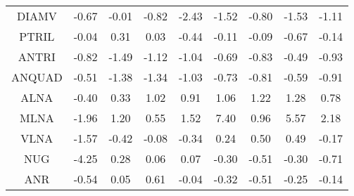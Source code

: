 \documentclass[11pt,a4paper]{report}
\begin{document}
\begin{longtable}{ | c || c | c | c | c | c | c | c || c |}
DIAMV &  \cellcolor[HTML]{FFEFEF} -0.67 &  \cellcolor[HTML]{FFFFFF} -0.01 &  \cellcolor[HTML]{FFE7E7} -0.82 &  \cellcolor[HTML]{FFBFBF} -2.43 &  \cellcolor[HTML]{FFD7D7} -1.52 &  \cellcolor[HTML]{FFE7E7} -0.80 &  \cellcolor[HTML]{FFD7D7} -1.53 &  \cellcolor[HTML]{FFE7E7} -1.11 \\
PTRIL &  \cellcolor[HTML]{FFFFFF} -0.04 &  \cellcolor[HTML]{F7F7FF} 0.31 &  \cellcolor[HTML]{FFFFFF} 0.03 &  \cellcolor[HTML]{FFF7F7} -0.44 &  \cellcolor[HTML]{FFFFFF} -0.11 &  \cellcolor[HTML]{FFFFFF} -0.09 &  \cellcolor[HTML]{FFEFEF} -0.67 &  \cellcolor[HTML]{FFFFFF} -0.14 \\
ANTRI &  \cellcolor[HTML]{FFE7E7} -0.82 &  \cellcolor[HTML]{FFD7D7} -1.49 &  \cellcolor[HTML]{FFDFDF} -1.12 &  \cellcolor[HTML]{FFE7E7} -1.04 &  \cellcolor[HTML]{FFEFEF} -0.69 &  \cellcolor[HTML]{FFE7E7} -0.83 &  \cellcolor[HTML]{FFEFEF} -0.49 &  \cellcolor[HTML]{FFE7E7} -0.93 \\
ANQUAD &  \cellcolor[HTML]{FFEFEF} -0.51 &  \cellcolor[HTML]{FFDFDF} -1.38 &  \cellcolor[HTML]{FFDFDF} -1.34 &  \cellcolor[HTML]{FFE7E7} -1.03 &  \cellcolor[HTML]{FFEFEF} -0.73 &  \cellcolor[HTML]{FFE7E7} -0.81 &  \cellcolor[HTML]{FFEFEF} -0.59 &  \cellcolor[HTML]{FFE7E7} -0.91 \\
ALNA &  \cellcolor[HTML]{FFF7F7} -0.40 &  \cellcolor[HTML]{F7F7FF} 0.33 &  \cellcolor[HTML]{E7E7FF} 1.02 &  \cellcolor[HTML]{E7E7FF} 0.91 &  \cellcolor[HTML]{E7E7FF} 1.06 &  \cellcolor[HTML]{DFDFFF} 1.22 &  \cellcolor[HTML]{DFDFFF} 1.28 &  \cellcolor[HTML]{EFEFFF} 0.78 \\
MLNA &  \cellcolor[HTML]{FFCFCF} -1.96 &  \cellcolor[HTML]{DFDFFF} 1.20 &  \cellcolor[HTML]{EFEFFF} 0.55 &  \cellcolor[HTML]{D7D7FF} 1.52 &  \cellcolor[HTML]{4848FF} 7.40 &  \cellcolor[HTML]{E7E7FF} 0.96 &  \cellcolor[HTML]{7070FF} 5.57 &  \cellcolor[HTML]{C7C7FF} 2.18 \\
VLNA &  \cellcolor[HTML]{FFD7D7} -1.57 &  \cellcolor[HTML]{FFF7F7} -0.42 &  \cellcolor[HTML]{FFFFFF} -0.08 &  \cellcolor[HTML]{FFF7F7} -0.34 &  \cellcolor[HTML]{F7F7FF} 0.24 &  \cellcolor[HTML]{EFEFFF} 0.50 &  \cellcolor[HTML]{EFEFFF} 0.49 &  \cellcolor[HTML]{FFF7F7} -0.17 \\
NUG &  \cellcolor[HTML]{FF9797} -4.25 &  \cellcolor[HTML]{F7F7FF} 0.28 &  \cellcolor[HTML]{FFFFFF} 0.06 &  \cellcolor[HTML]{FFFFFF} 0.07 &  \cellcolor[HTML]{FFF7F7} -0.30 &  \cellcolor[HTML]{FFEFEF} -0.51 &  \cellcolor[HTML]{FFF7F7} -0.30 &  \cellcolor[HTML]{FFEFEF} -0.71 \\
ANR &  \cellcolor[HTML]{FFEFEF} -0.54 &  \cellcolor[HTML]{FFFFFF} 0.05 &  \cellcolor[HTML]{EFEFFF} 0.61 &  \cellcolor[HTML]{FFFFFF} -0.04 &  \cellcolor[HTML]{FFF7F7} -0.32 &  \cellcolor[HTML]{FFEFEF} -0.51 &  \cellcolor[HTML]{FFF7F7} -0.25 &  \cellcolor[HTML]{FFFFFF} -0.14 \\

\end{longtable}
\end{document}
